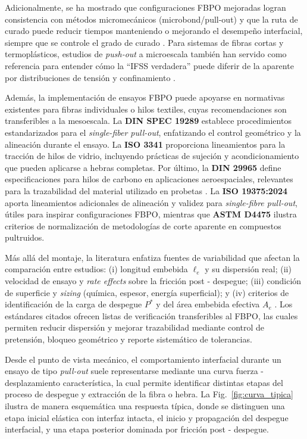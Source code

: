 Adicionalmente, se ha mostrado que configuraciones FBPO mejoradas logran consistencia con
métodos micromecánicos (microbond/pull-out) y que la ruta de curado puede
reducir tiempos manteniendo o mejorando el desempeño interfacial, siempre que se controle el grado
de curado \cite{Zhou2016}. Para sistemas de fibras cortas y termoplásticos, estudios de \textit{push-out}
a microescala también han servido como referencia para entender cómo la “IFSS verdadera” puede diferir de
la aparente por distribuciones de tensión y confinamiento \cite{Liu2021}.

Además, la implementación de ensayos FBPO puede apoyarse en normativas existentes para fibras
individuales o hilos textiles, cuyas recomendaciones son transferibles a la mesoescala. La
\textbf{DIN SPEC 19289} establece procedimientos estandarizados para el \textit{single-fiber
pull-out}, enfatizando el control geométrico y la alineación durante el ensayo. La
\textbf{ISO 3341} proporciona lineamientos para la tracción de hilos de vidrio, incluyendo
prácticas de sujeción y acondicionamiento que pueden aplicarse a hebras completas. Por último,
la \textbf{DIN 29965} define especificaciones para hilos de carbono en aplicaciones aeroespaciales,
relevantes para la trazabilidad del material utilizado en probetas
\cite{DINSPEC19289, ISO3341, DIN29965}. La \textbf{ISO 19375:2024} aporta lineamientos adicionales de alineación y validez para
\textit{single-fibre pull-out}, útiles para inspirar configuraciones FBPO, mientras que
\textbf{ASTM D4475} ilustra criterios de normalización de metodologías de corte aparente en compuestos
pultruidos.

Más allá del montaje, la literatura enfatiza fuentes de variabilidad que afectan la comparación
entre estudios: (i) longitud embebida \(\ell_e\) y su dispersión real; (ii) velocidad de ensayo y
\emph{rate effects} sobre la fricción post - despegue; (iii) condición de superficie y \textit{sizing}
(química, espesor, energía superficial); y (iv) criterios de identificación de la carga de despegue
\(P^{\ast}\) y del área embebida efectiva \(A_e\) \cite{Fischer2020,Liu2021,AhmadvashAghbash2024IMR}.
Los estándares citados ofrecen listas de verificación transferibles al FBPO, las cuales permiten
reducir dispersión y mejorar trazabilidad mediante control de pretensión, bloqueo geométrico y reporte
sistemático de tolerancias.

Desde el punto de vista mecánico, el comportamiento interfacial durante un ensayo de tipo
\textit{pull-out} suele representarse mediante una curva fuerza - desplazamiento característica, la cual
permite identificar distintas etapas del proceso de despegue y extracción de la fibra o hebra.
La Fig.~\ref{fig:curva_tipica} ilustra de manera esquemática una respuesta típica, donde se
distinguen una etapa inicial elástica con interfaz intacta, el inicio y propagación del despegue
interfacial, y una etapa posterior dominada por fricción post - despegue.

